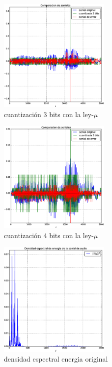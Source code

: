 \documentclass[10pt]{article}
\begin{document}
\begin{figure}[H]
   \centering
   \includegraphics[width=0.48\textwidth]{./Images/senialesv_voz_2_bits_mu.eps}
   \caption{cuantización 3 bits con la ley-$\mu$}\label{fig:qv_mu:3}     
\end{figure}

\begin{figure}[H]
   \centering
   \includegraphics[width=0.48\textwidth]{./Images/senialesv_voz_3_bits_mu.eps}
   \caption{cuantización 4 bits con la ley-$\mu$}\label{fig:qv_mu:4}     
\end{figure}

\begin{figure}[H]
   \centering
   \includegraphics[width=0.48\textwidth]{./Images/densidad_espectral_x.eps}
   \caption{densidad espectral energia original}\label{fig:densidad}     
\end{figure}
\end{document}
